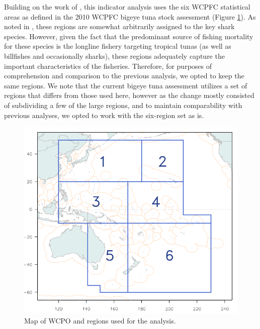 \documentclass[12pt]{SCreport}
\begin{document}
Building on the work of \citet{Clarke2011_a}, this indicator analysis uses the six WCPFC statistical areas as defined in the 2010 WCPFC bigeye tuna stock assessment (Figure \ref{fig:fig01}). As noted in \citet{Clarke2011_a}, these regions are somewhat arbitrarily assigned to the key shark species. However, given the fact that the predominant source of fishing mortality for these species is the longline fishery targeting tropical tunas (as well as billfishes and occasionally sharks), these regions adequately capture the important characteristics of the fisheries. Therefore, for purposes of comprehension and comparison to the previous analysis, we opted to keep the same regions. We note that the current bigeye tuna assessment utilizes a set of regions that differs from those used here, however as the change mostly consisted of subdividing a few of the large regions, and to maintain comparability with previous analyses, we opted to work with the six-region set as is.



\begin{figure}
\begin{center}
\includegraphics[width=\textwidth]{../GRAPHICS/Defined/FIG_01_MAP}
\caption{\label{fig:fig01} Map of WCPO and regions used for the analysis.}
\end{center}
\end{figure}

\end{document}
